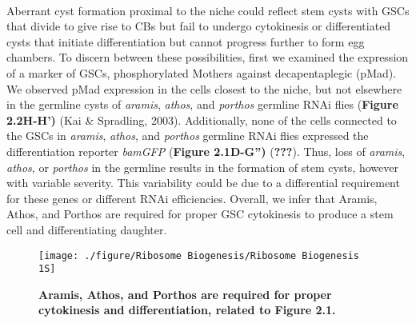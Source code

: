 \documentclass[12pt,oneside]{reedthesis}
\begin{document}

\textbf{\\
}

Aberrant cyst formation proximal to the niche could reflect stem cysts with GSCs that divide to give rise to CBs but fail to undergo cytokinesis or differentiated cysts that initiate differentiation but cannot progress further to form egg chambers. To discern between these possibilities, first we examined the expression of a marker of GSCs, phosphorylated Mothers against decapentaplegic (pMad). We observed pMad expression in the cells closest to the niche, but not elsewhere in the germline cysts of \emph{aramis}, \emph{athos}, and \emph{porthos} germline RNAi flies (\textbf{Figure 2.2H-H')} (Kai \& Spradling, 2003). Additionally, none of the cells connected to the GSCs in \emph{aramis}, \emph{athos}, and \emph{porthos} germline RNAi flies expressed the differentiation reporter \emph{bamGFP} (\textbf{Figure 2.1D-G'')} ({\textbf{???}}). Thus, loss of \emph{aramis}, \emph{athos}, or \emph{porthos} in the germline results in the formation of stem cysts, however with variable severity. This variability could be due to a differential requirement for these genes or different RNAi efficiencies. Overall, we infer that Aramis, Athos, and Porthos are required for proper GSC cytokinesis to produce a stem cell and differentiating daughter.
\begin{figure}

{\centering \texttt{[image: ./figure/Ribosome Biogenesis/Ribosome Biogenesis 1S]} 

}

\caption[\textbf{Aramis, Athos, and Porthos are required for proper cytokinesis and differentiation, related to Figure 2.1.}]{\textbf{Aramis, Athos, and Porthos are required for proper cytokinesis and differentiation, related to Figure 2.1.}}\label{fig:unnamed-chunk-7}
\end{figure}
\end{document}
